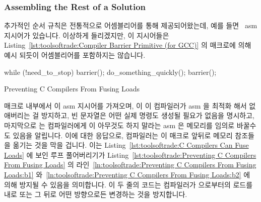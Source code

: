 \fi

\subsubsection{Assembling the Rest of a Solution}
\label{sec:toolsoftrade:Assembling the Rest of a Solution}

추가적인 순서 규칙은 전통적으로 어셈블리어를 통해 제공되어왔는데, 예를 들면
\GCC\ asm 지시어가 있습니다.
이상하게 들리겠지만, 이 지시어들은
Listing~\ref{lst:toolsoftrade:Compiler Barrier Primitive (for GCC)}
의  매크로에 의해 예시 되듯이 어셈블리어를 포함하지는 않습니다.

\begin{listing}[tbp]
\begin{fcvlabel}
\begin{VerbatimL}[commandchars=\\\[\]]
while (!need_to_stop) {
	barrier(); \lnlbl[b1]
	do_something_quickly();
	barrier(); \lnlbl[b2]
}
\end{VerbatimL}
\end{fcvlabel}
\caption{Preventing C Compilers From Fusing Loads}
\label{lst:toolsoftrade:Preventing C Compilers From Fusing Loads}
\end{listing}

 매크로 내부에서  이 asm 지시어를 가져오며,
 이 이 컴파일러가 asm 을 최적화 해서 없애버리는 걸 방지하고,
빈 문자열은 어떤 실제 명령도 생성될 필요가 없음을 명시하고, 마지막으로
 는 컴파일러에게 이 아무것도 하지 말라는 asm 은 메모리를 임의로
바꿀수도 있음을 알립니다.
이에 대한 응답으로, 컴파일러는 이  매크로 앞뒤로 메모리
참조들을 옮기는 것을 막을 겁니다.
이는
Listing~\ref{lst:toolsoftrade:C Compilers Can Fuse Loads}
에 보인 루프 풀어버리기가
Listing~\ref{lst:toolsoftrade:Preventing C Compilers From Fusing Loads}
의
라인~\ref{ln:toolsoftrade:Preventing C Compilers From Fusing Loads:b1}
와~\ref{ln:toolsoftrade:Preventing C Compilers From Fusing Loads:b2}
에 의해 방지될 수 있음을 의미합니다.
이 두 줄의 코드는 컴파일러가  으로부터의 로드를
 내로 또는 그 뒤로 어떤 방향으로든 변경하는 것을
방지합니다.

